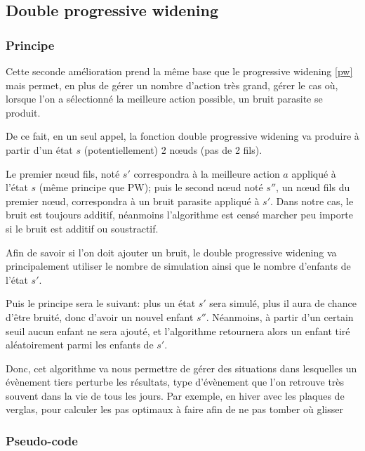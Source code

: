 \documentclass[pdftex,french, english]{article}	%
\begin{document}
	\subsection{Double progressive widening} \label{dpw}
		\subsubsection{Principe} \label{dpw:principe}

			Cette seconde amélioration prend la même base que le progressive widening \ref{pw} mais permet, en plus de gérer un nombre d'action très grand, gérer le cas où, lorsque l'on a sélectionné la meilleure action possible, un bruit parasite se produit.

			De ce fait, en un seul appel, la fonction double progressive widening va produire à partir d'un état $s$ (potentiellement) 2 nœuds (pas de 2 fils).

			Le premier nœud fils, noté $s'$ correspondra à la meilleure action $a$ appliqué à l'état $s$ (même principe que PW); puis le second nœud noté $s''$, un nœud fils du premier nœud, correspondra à un bruit parasite appliqué à $s'$.
			Dans notre cas, le bruit est toujours additif, néanmoins l'algorithme est censé marcher peu importe si le bruit est additif ou soustractif.

			Afin de savoir si l'on doit ajouter un bruit, le double progressive widening va principalement utiliser le nombre de simulation ainsi que le nombre d'enfants de l'état $s'$.

			Puis le principe sera le suivant: plus un état $s'$ sera simulé, plus il aura de chance d'être bruité, donc d'avoir un nouvel enfant $s''$. Néanmoins, à partir d'un certain seuil aucun enfant ne sera ajouté, et l'algorithme retournera alors un enfant tiré aléatoirement parmi les enfants de $s'$.

			Donc, cet algorithme va nous permettre de gérer des situations dans lesquelles un évènement tiers perturbe les résultats, type d'évènement que l'on retrouve très souvent dans la vie de tous les jours. Par exemple, en hiver avec les plaques de verglas, pour calculer les pas optimaux à faire afin de ne pas tomber où glisser 

		\subsubsection{Pseudo-code} \label{dpw:code}
\end{document}
